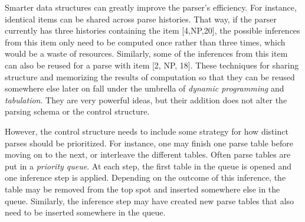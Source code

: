 Smarter data structures can greatly improve the parser's efficiency.
For instance, identical items can be shared across parse histories.
That way, if the parser currently has three histories containing the item [4,\psep NP,20], the possible inferences from this item only need to be computed once rather than three times, which would be a waste of resources.
Similarly, some of the inferences from this item can also be reused for a parse with item [2, \psep NP, 18].
These techniques for sharing structure and memorizing the results of computation so that they can be reused somewhere else later on fall under the umbrella of \emph{dynamic programming} and \emph{tabulation}.
They are very powerful ideas, but their addition does not alter the parsing schema or the control structure.

However, the control structure needs to include some strategy for how distinct parses should be prioritized.
For instance, one may finish one parse table before moving on to the next, or interleave the different tables.
Often parse tables are put in a \emph{priority queue}.
At each step, the first table in the queue is opened and one inference step is applied.
Depending on the outcome of this inference, the table may be removed from the top spot and inserted somewhere else in the queue.
Similarly, the inference step may have created new parse tables that also need to be inserted somewhere in the queue.




